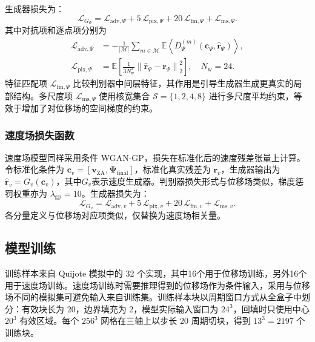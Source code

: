 生成器损失为：
\begin{equation}
  \mathcal{L}_{G_{\Psi}} = \mathcal{L}_{\mathrm{adv},\Psi} + 5\,\mathcal{L}_{\mathrm{pix},\Psi} + 20\,\mathcal{L}_{\mathrm{fm},\Psi} + \mathcal{L}_{\mathrm{ms},\Psi}.
\end{equation}
其中对抗项和逐点项分别为
\begin{align}
  \mathcal{L}_{\mathrm{adv},\Psi}
   & = -\frac{1}{|\mathcal{M}|} \sum_{m\in\mathcal{M}}
  \mathbb{E} \left\langle D_{\Psi}^{(m)}(\boldsymbol{c}_{\Psi},\hat{\boldsymbol{r}}_{\Psi}) \right\rangle, \\
  \mathcal{L}_{\mathrm{pix},\Psi}
   & = \mathbb{E} \left[
    \frac{1}{3N_{\mathrm{w}}^3}
    \left\| \hat{\boldsymbol{r}}_{\Psi} - \boldsymbol{r}_{\Psi} \right\|_2^2
    \right], \quad N_{\mathrm{w}}=24.
\end{align}
特征匹配项 $\mathcal{L}_{\mathrm{fm},\Psi}$ 比较判别器中间层特征，其作用是引导生成器生成更真实的局部结构。多尺度项 $\mathcal{L}_{\mathrm{ms},\Psi}$ 使用核宽集合 $\mathcal{S}=\{1,2,4,8\}$ 进行多尺度平均约束，等效于增加了对位移场的空间梯度的约束。

\subsubsection{速度场损失函数}

速度场模型同样采用条件 WGAN-GP，损失在标准化后的速度残差张量上计算。令标准化条件为 $\boldsymbol{c}_{v}=[\boldsymbol{v}_{\mathrm{ZA}},\boldsymbol{\Psi}_{\mathrm{final}}]$，标准化真实残差为 $\boldsymbol{r}_{v}$，生成器输出为 $\hat{\boldsymbol{r}}_{v}=G_v(\boldsymbol{c}_{v})$，其中$G_v$表示速度生成器。判别器损失形式与位移场类似，梯度惩罚权重亦为 $\lambda_{\mathrm{gp}}=10$。生成器损失为：
\begin{equation}
  \mathcal{L}_{G_v} = \mathcal{L}_{\mathrm{adv},v} + 5\,\mathcal{L}_{\mathrm{pix},v} + 20\,\mathcal{L}_{\mathrm{fm},v} + \mathcal{L}_{\mathrm{ms},v}.
\end{equation}
各分量定义与位移场对应项类似，仅替换为速度场相关量。

\subsection{模型训练}

训练样本来自 Quijote 模拟中的 32 个实现，其中16个用于位移场训练，另外16个用于速度场训练。速度场训练时需要推理得到的位移场作为条件输入，采用与位移场不同的模拟集可避免输入来自训练集。训练样本块以周期窗口方式从全盒子中划分：有效块长为 20，边界填充为 2，模型实际输入窗口为 $24^3$，回填时只使用中心 $20^3$ 有效区域。每个 $256^3$ 网格在三轴上以步长 20 周期切块，得到 $13^3=2197$ 个训练块。

